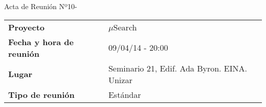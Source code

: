 \begin{center}	
\Large{Acta de Reunión Nº10\hspace{0.25em}-\hspace{0.25em}\tituloReunion}
\end{center}
\vspace{1.5em}

\begin{longtable}{ | L{\tabcolsep} |
				     L{\tabcolsep} | }
\hline %
  \\
\hline %
{\bf Proyecto} & $\mu$Search \\
\hline %
{\bf Fecha y hora de reunión} & 09/04/14 - 20:00 \\
\hline %
{\bf Lugar} & Seminario 21, Edif. Ada Byron. EINA. Unizar \\
\hline %
{\bf Tipo de reunión} & Estándar \\
\hline %
\end{longtable}


